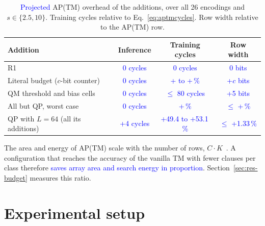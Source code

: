 \documentclass[preprint,12pt,times]{elsarticle}
\newcommand{\proj}[1]{\textcolor{blue}{#1}}
\newcommand{\add}[1]{{\color{blue}#1}}
\begin{document}
\begin{table}[!htbp]
\centering
\caption{\proj{Projected} AP(TM) overhead of the additions, over all 26 encodings and $s \in \{2.5, 10\}$. Training cycles relative to Eq.~\eqref{eq:aptmcycles}. Row width relative to the AP(TM) row.}
\label{tab:hw}
\small
\begin{tabular}{lccc}
\toprule
Addition & Inference & Training cycles & Row width \\
\midrule
R1 & \proj{0 cycles} & \proj{0 cycles} & \proj{0 bits} \\
Literal budget ($c$-bit counter) & \proj{0 cycles} & \proj{+\numhwLmindc{} to +\numhwLmaxge{}\,\%} & \proj{+$c$ bits} \\
QM threshold and bias cells & \proj{0 cycles} & \proj{$\le$ 80 cycles} & \proj{+5 bits} \\
All \add{ but QP}, worst case & \proj{0 cycles} & \proj{+\numhwLmaxge{}\,\%} & \proj{$\le$ +\numhwareamax{}\,\%} \\
\add{QP with $L = 64$ (all its additions)} & \proj{+4 cycles} & \proj{+49.4 to +53.1\,\%} & \proj{$\le$ +1.33\,\%} \\
\bottomrule
\end{tabular}
\end{table}

The area and energy of AP(TM) scale with the number of rows, $C \cdot K$~\cite{shrot2026aptm}.
A configuration that reaches the accuracy of the vanilla TM with fewer clauses per class therefore \proj{saves array area and search energy in proportion}.
Section~\ref{sec:res-budget} measures this ratio.

\section{Experimental setup}
\label{sec:setup}
\end{document}
